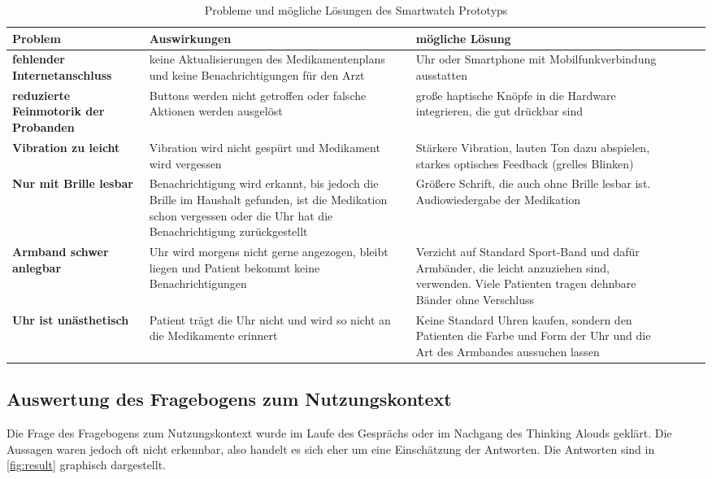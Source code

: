 \begin{table}[]
\centering
\caption{Probleme und mögliche Lösungen des Smartwatch Prototyps}
\label{ch:problems}
\begin{tabular}{p{4cm} p{5cm} p{5cm}|l|l|l|}
\hline
 Problem  &Auswirkungen  &mögliche Lösung  \\ \hline
 \textbf{fehlender Internetanschluss}  &keine Aktualisierungen des Medikamentenplans und keine Benachrichtigungen für den Arzt &Uhr oder Smartphone mit Mobilfunkverbindung ausstatten  \\
 \textbf{reduzierte Feinmotorik der Probanden} &Buttons werden nicht getroffen oder falsche Aktionen werden ausgelöst  &große haptische Knöpfe in die Hardware integrieren, die gut drückbar sind  \\
 \textbf{Vibration zu leicht}&Vibration wird nicht gespürt und Medikament wird vergessen  &Stärkere Vibration, lauten Ton dazu abspielen, starkes optisches Feedback (grelles Blinken)   \\
 \textbf{Nur mit Brille lesbar} &Benachrichtigung wird erkannt, bis jedoch die Brille im Haushalt gefunden, ist die Medikation schon vergessen oder die Uhr hat die Benachrichtigung zurückgestellt  &Größere Schrift, die auch ohne Brille lesbar ist. Audiowiedergabe der Medikation  \\
 \textbf{Armband schwer anlegbar}&Uhr wird morgens nicht gerne angezogen,  bleibt liegen und Patient bekommt keine Benachrichtigungen  &Verzicht auf Standard Sport-Band und dafür Armbänder, die leicht anzuziehen sind, verwenden. Viele Patienten tragen dehnbare Bänder ohne Verschluss \\
 \textbf{Uhr ist unästhetisch}&Patient trägt die Uhr nicht und wird so nicht an die Medikamente erinnert  &Keine Standard Uhren kaufen, sondern den Patienten die Farbe und Form der Uhr und die Art des Armbandes aussuchen lassen  \\ \hline
\end{tabular}
\end{table}
\subsection{Auswertung des Fragebogens zum Nutzungskontext}
Die Frage des Fragebogens zum Nutzungskontext wurde im Laufe des Gesprächs oder im Nachgang des Thinking Alouds geklärt. Die Aussagen waren jedoch oft nicht erkennbar, also handelt es sich eher um eine Einschätzung der Antworten. Die Antworten sind in \ref{fig:result} graphisch dargestellt.

